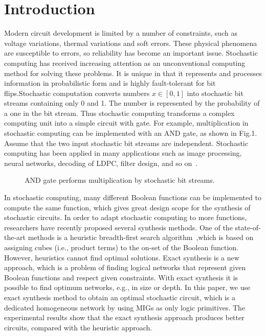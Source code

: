 \documentclass[conference,letterpaper]{IEEEtran}
\begin{document}
\section*{Introduction}
Modern circuit development is limited by a number of constraints, such as voltage variations, thermal variations and soft errors. These physical phenomena are susceptible to errors, so reliability has become an important issue. Stochastic computing has received increasing attention as an unconventional computing method for solving these problems. It is unique in that it represents and processes information in probabilistic form and is highly fault-tolerant for bit flips.Stochastic computation converts numbers $x \in[0,1]$ into stochastic bit streams containing only 0 and 1. The number is represented by the probability of a one in the bit stream. Thus stochastic computing transforms a complex computing unit into a simple  circuit with gate. For example, multiplication in stochastic computing can be implemented with an AND gate, as shown in Fig.1.  Assume
that the two input stochastic bit streams are independent. Stochastic computing has been applied in many applications such as image processing, neural networks, decoding of LDPC, filter design, and so on~\cite{1}.

\begin{figure}[t]
    \setlength{\abovecaptionskip}{0.cm}
    \setlength{\belowcaptionskip}{-0.5cm}
    \centering
    \caption{AND gate performs multiplication by stochastic bit streams.}
\end{figure}

In stochastic computing, many different Boolean functions can be implemented to compute the same function, which gives great design scope for the synthesis of stochastic circuits. In order to adapt stochastic computing to more functions, researchers have recently proposed several synthesis methods. One of the state-of-the-art methods is a heuristic breadth-first search algorithm~\cite{2},which is based on assigning
cubes (i.e., product terms) to the on-set of the Boolean function. However, heuristics cannot find optimal solutions. Exact synthesis is a new approach, which is a problem of finding logical networks that represent given Boolean functions and respect given constraints. With exact synthesis it is possible to find optimum networks, e.g., in size or depth. In this paper, we use exact synthesis method to obtain an optimal stochastic circuit, which is a dedicated homogeneous network by using MIGs as only logic primitives. The experimental results show that the exact synthesis approach produces better circuits, compared with the heuristic approach.
\end{document}
